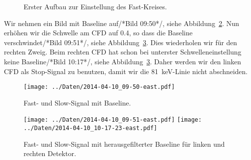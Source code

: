 \begin{figure}[htbp]
    \centering
    \caption{%
        Erster Aufbau zur Einstellung des Fast-Kreises.
    }
    \label{fig:aufbau:fast1}
\end{figure}

Wir nehmen ein Bild mit Baseline auf/*Bild 09:50*/, siehe
Abbildung~\ref{fig:cfd_einstellen_baseline}. Nun erhöhen wir die Schwelle am
CFD auf \num{0.4}, so dass die Baseline verschwindet/*Bild 09:51*/, siehe
Abbildung~\ref{fig:cfd_einstellen}. Dies wiederholen wir für den rechten Zweig.
Beim rechten CFD hat schon bei unterster Schwelleneinstellung keine
Baseline/*Bild 10:17*/, siehe Abbildung~\ref{fig:cfd_einstellen}. Daher werden
wir den linken CFD als Stop-Signal zu benutzen, damit wir die
\SI{81}{\kilo\electronvolt}-Linie nicht abschneiden.

\begin{figure}[htbp]
    \texttt{[image: ../Daten/2014-04-10\_09-50-east.pdf]}
    \caption{%
        Fast- und Slow-Signal mit Baseline.
    }
    \label{fig:cfd_einstellen_baseline}
\end{figure}

\begin{figure}[htbp]
    \centering
    \texttt{[image: ../Daten/2014-04-10\_09-51-east.pdf]}
    \hfill
    \texttt{[image: ../Daten/2014-04-10\_10-17-23-east.pdf]}
    \caption{%
        Fast- und Slow-Signal mit herausgefilterter Baseline für linken und
        rechten Detektor.
    }
    \label{fig:cfd_einstellen}
\end{figure}

